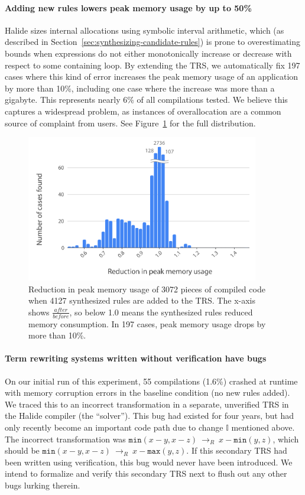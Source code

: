\documentclass[acmsmall,review]{acmart}\settopmatter{printfolios=true,printccs=false,printacmref=false}
\newcommand{\hmax}[0]{\texttt{max}}
\newcommand{\hmin}[0]{\texttt{min}}
\newcommand{\rewrites}[0]{\:\rightarrow_{R}\:}
\begin{document}
\paragraph{Adding new rules lowers peak memory usage by up to 50\%}
Halide sizes internal allocations using symbolic interval arithmetic,
which (as described in Section~\ref{sec:synthesizing-candidate-rules})
is prone to overestimating bounds when
expressions do not either monotonically increase or decrease with
respect to some containing loop. By extending the TRS, we
automatically fix 197 cases where this kind of error increases the
peak memory usage of an application by more than 10\%, including one
case where the increase was more than a gigabyte. This represents
nearly 6\% of all compilations tested. We believe this captures a
widespread problem, as instances of overallocation are a common source
of complaint from users. See Figure~\ref{fig:peakmemoryhistogram} for
the full distribution. 

\begin{figure}
  \includegraphics[width=4in]{figures/memoryhistogram.pdf}
\caption{Reduction in peak memory usage of 3072 pieces of compiled
  code when 4127 synthesized rules are added to the TRS. The x-axis
  shows $\frac{after}{before}$, so below 1.0 means the synthesized rules
  reduced memory consumption.  In 197 cases,
  peak memory usage drops by more than 10\%.}
\label{fig:peakmemoryhistogram}
\end{figure}

\paragraph{Term rewriting systems written without verification have bugs}
On our initial run of this experiment, 55 compilations (1.6\%) crashed
at runtime with memory corruption errors in the baseline condition (no
new rules added). We traced this to an incorrect transformation in a
separate, unverified TRS in the Halide compiler (the ``solver''). This
bug had existed for four years, but had only recently become an
important code path due to change $\mathbb{I}$ mentioned above. The
incorrect transformation was $\hmin(x - y, x - z) \rewrites x - \hmin(y, z)$,
which should be $\hmin(x - y, x - z) \rewrites x - \hmax(y, z)$. If this
secondary TRS had been written using verification, this bug would
never have been introduced. We intend to formalize and verify this
secondary TRS next to flush out any other bugs lurking therein.
\end{document}
